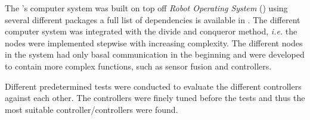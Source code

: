 The \abbrROV's computer system was built on top off \textit{Robot Operating System} (\abbrROS) using several different packages a full list of dependencies is available in . The different computer system was integrated with the divide and conqueror method, \textit{i.e.} the nodes were implemented stepwise with increasing complexity. The different nodes in the system had only basal communication in the beginning and were developed to contain more complex functions, such as sensor fusion and controllers. 

Different predetermined tests were conducted to evaluate the different controllers against each other. The controllers were finely tuned before the tests and thus the most suitable controller/controllers were found.


